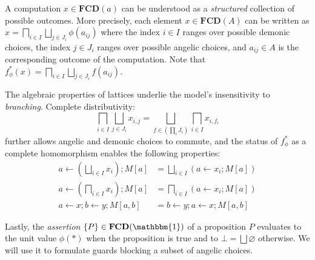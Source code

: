 \documentclass[sigplan,screen]{acmart}
\begin{document}
A computation $x \in \mathbf{FCD}(a)$
can be understood as
a \emph{structured} collection of possible outcomes.
More precisely,
each element $x \in \mathbf{FCD}(A)$ can be written as
$
    x = \bigsqcap_{i \in I} \bigsqcup_{j \in J_i} \phi(a_{ij})
$
where
the index $i \in I$ ranges over possible demonic choices,
the index $j \in J_i$ ranges over possible angelic choices,
and $a_{ij} \in A$ is the corresponding outcome of the computation.
Note that
$f_\phi^*(x) = \bigsqcap_{i \in I} \bigsqcup_{j \in J_i} f(a_{ij})$.

The algebraic properties of lattices
underlie the model's insensitivity to \emph{branching}.
Complete distributivity:
\[
    \bigsqcap_{i \in I} \bigsqcup_{j \in J_i} x_{i,j} =
    \bigsqcup_{f \in (\prod_i J_i)} \bigsqcap_{i \in I} x_{i, f_i}
\]
further allows angelic and demonic choices to commute,
and the status of $f^*_\phi$ as a complete homomorphism
enables the following properties:
\begin{align*}
    a \leftarrow \left( \bigsqcup_{i \in I} x_i \right) ; M[a] &=
      \bigsqcup_{i \in I} (a \leftarrow x_i ; M[a])
    \\
    a \leftarrow \left( \bigsqcap_{i \in I} x_i \right) ; M[a] &=
      \bigsqcap_{i \in I} (a \leftarrow x_i ; M[a])
    \\
    a \leftarrow x ; b \leftarrow y ; M[a,b] &=
    b \leftarrow y ; a \leftarrow x ; M[a,b]
\end{align*}

Lastly,
the \emph{assertion} $\{P\} \in \mathbf{FCD}(\mathbbm{1})$ of a proposition $P$
evaluates to the unit value $\phi(*)$ when the proposition is true
and to $\bot = \bigsqcup \varnothing$ otherwise.
We will use it to formulate guards
blocking a subset of angelic choices.

%
%
\end{document}
